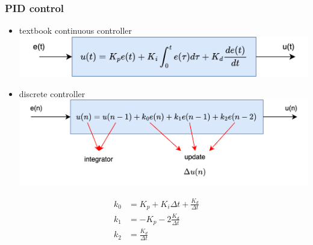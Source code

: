 \documentclass{beamer}
\begin{document}
\begin{frame}
  
  \frametitle{\bf PID control}

  \begin{itemize}
    \item textbook continuous controller 
    {\centering \includegraphics[scale=0.6]{../diagrams/control_generic/control_generic-pid.png}}
    \item discrete controller 
    {\centering \includegraphics[scale=0.6]{../diagrams/control_generic/control_generic-pid_discrete.png}}
  \end{itemize}

  \begin{align*}
    k_0 &= K_p + K_i\Delta t + \frac{K_d}{\Delta t} \\
    k_1 &= -K_p - 2\frac{K_d}{\Delta t} \\
    k_2 &= \frac{K_d}{\Delta t}
  \end{align*}

\end{frame}
\end{document}
